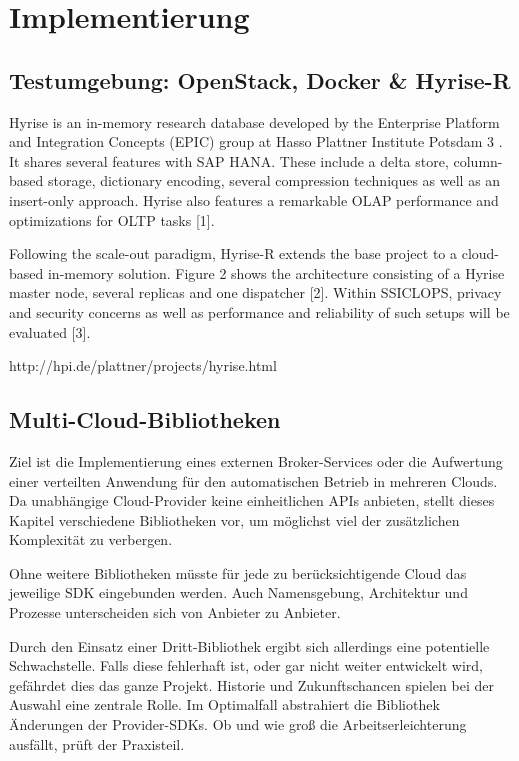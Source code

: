 \chapter{Implementierung}

\section{Testumgebung: OpenStack, Docker \& Hyrise-R}

Hyrise is an in-memory research database developed by the
Enterprise Platform and Integration Concepts (EPIC) group at
Hasso Plattner Institute Potsdam 3 . It shares several features
with SAP HANA. These include a delta store, column-based
storage, dictionary encoding, several compression techniques
as well as an insert-only approach. Hyrise also features a
remarkable OLAP performance and optimizations for OLTP
tasks [1].

Following the scale-out paradigm, Hyrise-R extends the
base project to a cloud-based in-memory solution. Figure 2
shows the architecture consisting of a Hyrise master node,
several replicas and one dispatcher [2]. Within SSICLOPS,
privacy and security concerns as well as performance and
reliability of such setups will be evaluated [3].

http://hpi.de/plattner/projects/hyrise.html

\section{Multi-Cloud-Bibliotheken}

Ziel ist die Implementierung eines externen Broker-Services oder die Aufwertung einer verteilten Anwendung für den automatischen Betrieb in mehreren Clouds. Da unabhängige Cloud-Provider keine einheitlichen APIs anbieten, stellt dieses Kapitel verschiedene Bibliotheken vor, um möglichst viel der zusätzlichen Komplexität zu verbergen.

Ohne weitere Bibliotheken müsste für jede zu berücksichtigende Cloud das jeweilige SDK eingebunden werden. Auch Namensgebung, Architektur und Prozesse unterscheiden sich von Anbieter zu Anbieter. 

Durch den Einsatz einer Dritt-Bibliothek ergibt sich allerdings eine potentielle Schwachstelle. Falls diese fehlerhaft ist, oder gar nicht weiter entwickelt wird, gefährdet dies das ganze Projekt. Historie und Zukunftschancen spielen bei der Auswahl eine zentrale Rolle. Im Optimalfall abstrahiert die Bibliothek Änderungen der Provider-SDKs. Ob und wie groß die Arbeitserleichterung ausfällt, prüft der Praxisteil.

